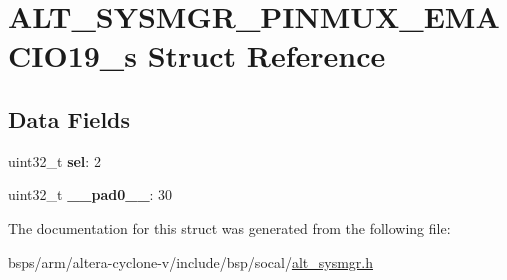 \hypertarget{structALT__SYSMGR__PINMUX__EMACIO19__s}{}\section{A\+L\+T\+\_\+\+S\+Y\+S\+M\+G\+R\+\_\+\+P\+I\+N\+M\+U\+X\+\_\+\+E\+M\+A\+C\+I\+O19\+\_\+s Struct Reference}
\label{structALT__SYSMGR__PINMUX__EMACIO19__s}
\subsection*{Data Fields}
\begin{DoxyCompactItemize}
\item 
\mbox{\label{structALT__SYSMGR__PINMUX__EMACIO19__s_a059e4a21e22669b29aced1d4957c6d9b}} 
uint32\+\_\+t {\bfseries sel}\+: 2
\item 
\mbox{\label{structALT__SYSMGR__PINMUX__EMACIO19__s_ab0c646fff0933be6332e78cc0c501293}} 
uint32\+\_\+t {\bfseries \+\_\+\+\_\+pad0\+\_\+\+\_\+}\+: 30
\end{DoxyCompactItemize}


The documentation for this struct was generated from the following file\+:\begin{DoxyCompactItemize}
\item 
bsps/arm/altera-\/cyclone-\/v/include/bsp/socal/\mbox{\hyperlink{alt__sysmgr_8h}{alt\+\_\+sysmgr.\+h}}\end{DoxyCompactItemize}
